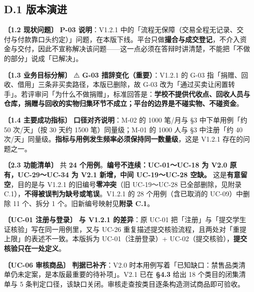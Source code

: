 \documentclass[12pt,a4paper]{ctexart}
\begin{document}
\subsection*{D.1 版本演进}
{\small\textbf{〔1.2 现状问题〕} \textbf{P-03 说明}：V1.2.1 中的「流程无保障（交易全程无记录、交付与付款靠口头约定）」问题，在本版下线。平台只做\textbf{撮合与成交登记}，不介入资金与交付，因此不宣称解决该问题——这一点必须在答辩时讲清楚，不能把「不做的部分」说成「已解决」。}\par
\vspace{0.35em}
{\small\textbf{〔1.3 业务目标分解〕} ⚠️ \textbf{G-03 措辞变化（重要）}：V1.2.1 的 G-03 指「捐赠、回收、借用」三条非买卖路径，本版已删除，故 G-03 改为「通过买卖让闲置转手」。若评审问「为什么不做捐赠」，标准回答是：\textbf{学校不提供代收点、回收人员与仓库，捐赠与回收的实物归集环节不成立；平台的边界是不碰实物、不碰资金}。}\par
\vspace{0.35em}
{\small\textbf{〔1.4 主要成功指标〕} \textbf{口径对齐说明}：M-02 的 1000 笔/月与 §3 中下单用例「约 50 次/天」（按 30 天约 1500 笔）同量级；M-01 的 1000 人与 §3 中注册「约 40 次/天」同量级。\textbf{指标与用例发生频率必须保持同一数量级}，这是 V1.2.1 存在的问题之一。}\par
\vspace{0.35em}
{\small\textbf{〔2.3 功能清单〕} 共 \textbf{24 个用例}。\textbf{编号不连续：UC-01～UC-18 为 V2.0 原有，UC-29～UC-34 为 V2.1 新增，中间 UC-19～UC-28 空缺。} 这是\textbf{有意留空}，目的是与 V1.2.1 的旧编号\textbf{零冲突}（旧 UC-19～UC-28 已全部删除，见附录 C.1），\textbf{不得被误判为缺号或笔误}。V1.2.1 的 28 个用例（含已取消的 UC-09）中删除 11 个、拆分 1 个。旧新编号映射见\textbf{附录 C.1}。}\par
\vspace{0.35em}
{\small\textbf{〔UC-01 注册与登录〕} \textbf{与 V1.2.1 的差异}：原 UC-01 把「注册」与「提交学生证核验」写在同一用例里，又与 UC-26 重复描述提交核验流程，且两处对「重提上限」的表述不一致。本版拆为 UC-01（注册登录）+ UC-02（提交核验），\textbf{提交核验只在一处定义}。}\par
\vspace{0.35em}
{\small\textbf{〔UC-06 审核商品〕} \textbf{判据已补齐}：V2.0 时本用例写着「已知缺口：禁售品类清单仍未定案，是本版最重要的待补项」。V2.1 已在 \textbf{§4.3} 给出 18 个类目的闭集清单与 5 条判定口径，该缺口关闭。审核走查按类目逐条构造测试商品即可验收。}\par
\vspace{0.35em}
\end{document}
